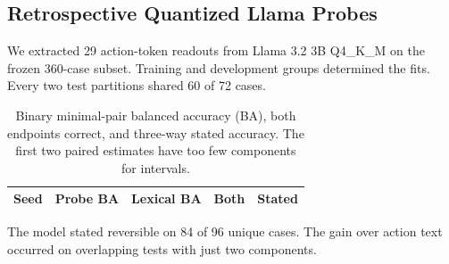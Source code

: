 \subsection{Retrospective Quantized Llama Probes}

We extracted 29 action-token readouts from Llama 3.2 3B Q4\_K\_M on
the frozen 360-case subset. Training and development groups determined
the fits. Every two test partitions shared 60 of 72 cases.

\begin{table}[!htb]
  \centering\small\setlength{\tabcolsep}{3pt}
  \begin{tabular}{lrrrr}
    \toprule
    Seed & Probe BA & Lexical BA & Both & Stated \\
    \midrule
    
    \bottomrule
  \end{tabular}
  \caption{Binary minimal-pair balanced accuracy (BA), both endpoints
    correct, and three-way stated accuracy. The first two paired
    estimates have too few components for intervals.}
\end{table}

The model stated reversible on 84 of 96 unique cases. The gain over
action text occurred on overlapping tests with just two components.
